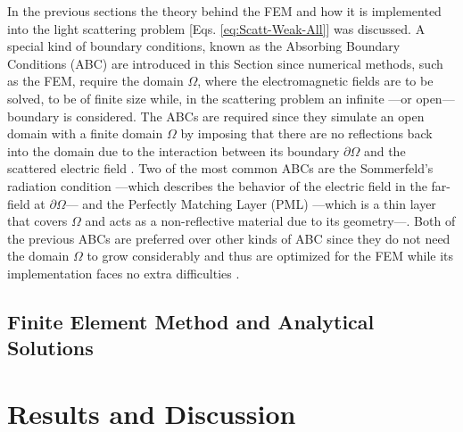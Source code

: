 \documentclass[11pt]{Latex/Classes/PhDthesisPSnPDF}
\begin{document}
        In the previous sections the theory behind the FEM and how it is  implemented into the light scattering problem [Eqs. \eqref{eq:Scatt-Weak-All}] was discussed. A special kind of boundary conditions, known as the Absorbing Boundary Conditions (ABC) are introduced in this Section since numerical methods, such as the FEM, require the domain $\Omega$, where the electromagnetic fields are to be solved, to be of finite size \cite{jin_theory_2010,bondeson_computational_2005} while, in the scattering problem an infinite ---or open--- boundary is considered. The  ABCs are required since they simulate an open domain with a finite domain $\Omega$ by imposing that there are no reflections back into the domain due to the interaction between its boundary $\partial\Omega$ and the scattered electric field \cite{bondeson_computational_2005,jin_theory_2010,chew_complex_1997}. Two of the most common ABCs are the Sommerfeld's radiation condition ---which describes the behavior of the electric field in the far-field at $\partial\Omega$--- and the Perfectly Matching Layer (PML) ---which is a thin layer that covers $\Omega$ and acts as a non-reflective material due to its geometry---\cite{jin_theory_2010}.  Both of the previous ABCs are preferred over other kinds of ABC since they do not need the domain $\Omega$ to grow considerably and thus are optimized for the FEM while its implementation faces no extra difficulties \cite{jin_theory_2010}.

         

	\section{Finite Element Method and Analytical Solutions}
		\label{sec:FEM-Mie}
		

%

\chapter{Results and Discussion}
\end{document}
